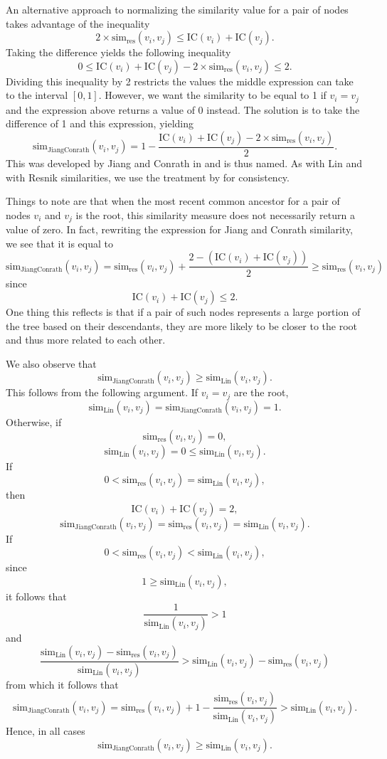 \documentclass[article]{jss}
\begin{document}
An alternative approach to normalizing the similarity value for a pair of nodes takes advantage of the inequality $$2 \times \textrm{sim}_{\textrm{res}}(v_i, v_j) \leq \textrm{IC}(v_i) + \textrm{IC}(v_j).$$ Taking the difference yields the following inequality $$0 \leq \textrm{IC}(v_i) + \textrm{IC}(v_j) - 2 \times \textrm{sim}_{\textrm{res}}(v_i, v_j) \leq 2.$$ Dividing this inequality by 2 restricts the values the middle expression can take to the interval $[0,1]$. However, we want the similarity to be equal to 1 if $v_i = v_j$ and the expression above returns a value of 0 instead. The solution is to take the difference of 1 and this expression, yielding $$\textrm{sim}_{\textrm{JiangConrath}}(v_i, v_j) = 1 - \frac{\textrm{IC}(v_i) + \textrm{IC}(v_j) - 2 \times \textrm{sim}_{\textrm{res}}(v_i, v_j)}{2}.$$ This was developed by Jiang and Conrath  in \cite{jiang1997semantic} and is thus named. As with Lin and with Resnik similarities, we use the treatment by \cite{seco2004intrinsic} for consistency.

Things to note are that when the most recent common ancestor for a pair of nodes $v_i$ and $v_j$ is the root, this similarity measure does not necessarily return a value of zero. In fact, rewriting the expression for Jiang and Conrath similarity, we see that it is equal to $$\textrm{sim}_{\textrm{JiangConrath}}(v_i, v_j) = \textrm{sim}_{\textrm{res}}(v_i, v_j) + \frac{2 - (\textrm{IC}(v_i) + \textrm{IC}(v_j))}{2} \geq \textrm{sim}_{\textrm{res}}(v_i, v_j)$$ since $$\textrm{IC}(v_i) + \textrm{IC}(v_j) \leq 2.$$ One thing this reflects is that if a pair of such nodes represents a large portion of the tree based on their descendants, they are more likely to be closer to the root and thus more related to each other.

We also observe that $$\textrm{sim}_{\textrm{JiangConrath}}(v_i, v_j) \geq \textrm{sim}_{\textrm{Lin}}(v_i, v_j).$$ This follows from the following argument. If $v_i = v_j$ are the root, $$\textrm{sim}_{\textrm{Lin}}(v_i, v_j) = \textrm{sim}_{\textrm{JiangConrath}}(v_i, v_j) = 1.$$ Otherwise, if $$\textrm{sim}_{\textrm{res}}(v_i, v_j) = 0,$$ $$\textrm{sim}_{\textrm{Lin}}(v_i, v_j) = 0 \leq \textrm{sim}_{\textrm{Lin}}(v_i, v_j).$$ If $$0 < \textrm{sim}_{\textrm{res}}(v_i, v_j) = \textrm{sim}_{\textrm{Lin}}(v_i, v_j),$$ then $$\textrm{IC}(v_i) + \textrm{IC}(v_j) = 2,$$ $$\textrm{sim}_{\textrm{JiangConrath}}(v_i, v_j) = \textrm{sim}_{\textrm{res}}(v_i, v_j) = \textrm{sim}_{\textrm{Lin}}(v_i, v_j).$$ If $$0 < \textrm{sim}_{\textrm{res}}(v_i, v_j) < \textrm{sim}_{\textrm{Lin}}(v_i, v_j),$$ since $$1 \geq \textrm{sim}_{\textrm{Lin}}(v_i, v_j),$$ it follows that $$\frac{1}{\textrm{sim}_{\textrm{Lin}}(v_i, v_j)} > 1$$ and $$\frac{\textrm{sim}_{\textrm{Lin}}(v_i, v_j) - \textrm{sim}_{\textrm{res}}(v_i, v_j)}{\textrm{sim}_{\textrm{Lin}}(v_i, v_j)} > \textrm{sim}_{\textrm{Lin}}(v_i, v_j) - \textrm{sim}_{\textrm{res}}(v_i, v_j)$$ from which it follows that $$\textrm{sim}_{\textrm{JiangConrath}}(v_i, v_j) = \textrm{sim}_{\textrm{res}}(v_i, v_j) + 1 - \frac{\textrm{sim}_{\textrm{res}}(v_i, v_j)}{\textrm{sim}_{\textrm{Lin}}(v_i, v_j)} > \textrm{sim}_{\textrm{Lin}}(v_i, v_j).$$ Hence, in all cases $$\textrm{sim}_{\textrm{JiangConrath}}(v_i, v_j) \geq \textrm{sim}_{\textrm{Lin}}(v_i, v_j).$$
\end{document}
